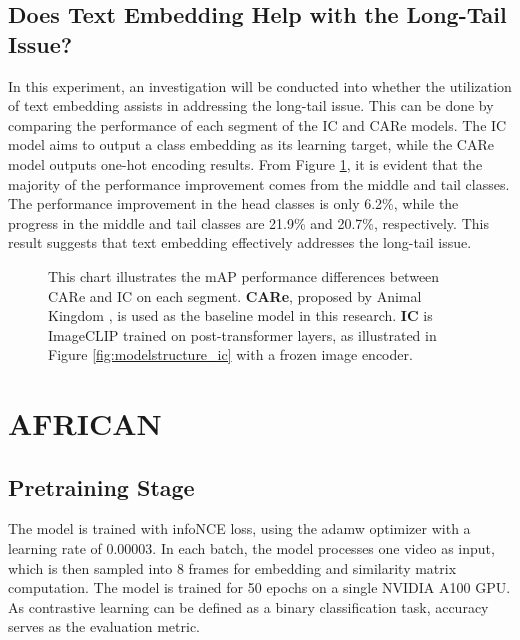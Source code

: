 \subsection{Does Text Embedding Help with the Long-Tail Issue?}
In this experiment, an investigation will be conducted into whether the utilization of text embedding assists in addressing the long-tail issue. This can be done by comparing the performance of each segment of the IC and CARe models. The IC model aims to output a class embedding as its learning target, while the CARe model outputs one-hot encoding results. From Figure \ref{fig:tp_longtailcomp}, it is evident that the majority of the performance improvement comes from the middle and tail classes. The performance improvement in the head classes is only 6.2\%, while the progress in the middle and tail classes are 21.9\% and 20.7\%, respectively. This result suggests that text embedding effectively addresses the long-tail issue. 

\begin{figure}[ht]
    \centering
    \resizebox{0.75\textwidth}{!}{}
    \caption[mAP Performance Differences between CARe and IC on each Segment]{This chart illustrates the mAP performance differences between CARe and IC on each segment. \textbf{CARe}, proposed by Animal Kingdom \parencite{ng2022animal}, is used as the baseline model in this research. \textbf{IC} is ImageCLIP trained on post-transformer layers, as illustrated in Figure \ref{fig:modelstructure_ic} with a frozen image encoder.}
    \label{fig:tp_longtailcomp}
\end{figure}



\section{AFRICAN}
\subsection{Pretraining Stage}
The model is trained with infoNCE \parencite{oord2019representation} loss, using the adamw optimizer with a learning rate of 0.00003. In each batch, the model processes one video as input, which is then sampled into 8 frames for embedding and similarity matrix computation. The model is trained for 50 epochs on a single NVIDIA A100 GPU. As contrastive learning can be defined as a binary classification task, accuracy serves as the evaluation metric.

